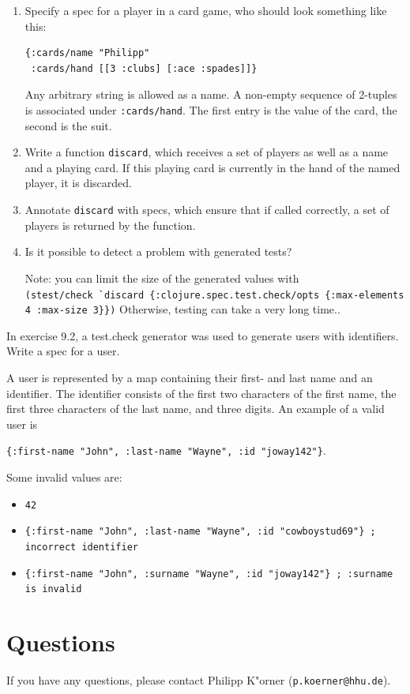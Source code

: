 \documentclass[11pt,a4paper]{article}
\begin{document}
\begin{exercise}[Specs]
\begin{enumerate}[label=\alph*)]
\item
Specify a spec for a player in a card game,
who should look something like this:

\begin{verbatim}
{:cards/name "Philipp"
 :cards/hand [[3 :clubs] [:ace :spades]]} 
\end{verbatim}

Any arbitrary string is allowed as a name.
A non-empty sequence of 2-tuples is associated under \verb|:cards/hand|.
The first entry is the value of the card, the second is the suit.

\item
Write a function \verb|discard|,
which receives a set of players
as well as a name and a playing card.
If this playing card is currently in the hand
of the named player, it is discarded.

\item
Annotate \verb|discard| with specs, which ensure
that if called correctly, a set of players
is returned by the function.

\item
Is it possible to detect a problem with generated tests?

Note: you can limit the size of the generated values with\\
\verb|(stest/check `discard {:clojure.spec.test.check/opts {:max-elements 4 :max-size 3}})|
Otherwise, testing can take a very long time..
\end{enumerate}
\end{exercise}

\begin{exercise}[Specs II]
    In exercise 9.2, a test.check generator was used to generate users with identifiers.
    Write a spec for a user.

    A user is represented by a map
    containing their first- and last name and an identifier.
    The identifier consists of the first two characters of the first name,
    the first three characters of the last name, and three digits.
    An example of a valid user is 
    
    \verb|{:first-name "John", :last-name "Wayne", :id "joway142"}|.

    Some invalid values are:
    \begin{itemize}
        \item \verb|42|
        \item \verb|{:first-name "John", :last-name "Wayne", :id "cowboystud69"} ; incorrect identifier|
        \item \verb|{:first-name "John", :surname "Wayne", :id "joway142"} ; :surname is invalid|
    \end{itemize}
\end{exercise}


\section*{Questions}
If you have any questions, please contact Philipp K"orner (\texttt{p.koerner@hhu.de}).
\end{document}
